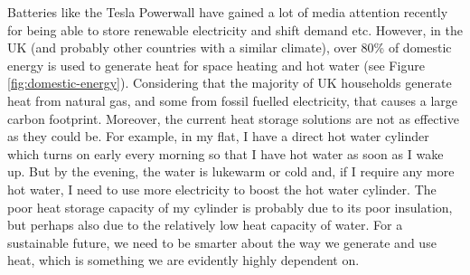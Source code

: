 Batteries like the Tesla Powerwall have gained a lot of media attention recently for being able to store renewable electricity and shift demand etc.
However, in the UK (and probably other countries with a similar climate), over 80\% of domestic energy is used to generate heat for space heating and hot water (see Figure \ref{fig:domestic-energy}).
Considering that the majority of UK households generate heat from natural gas, and some from fossil fuelled electricity, that causes a large carbon footprint.
Moreover, the current heat storage solutions are not as effective as they could be.
For example, in my flat, I have a direct hot water cylinder which turns on early every morning so that I have hot water as soon as I wake up.
But by the evening, the water is lukewarm or cold and, if I require any more hot water, I need to use more electricity to boost the hot water cylinder.
The poor heat storage capacity of my cylinder is probably due to its poor insulation, but perhaps also due to the relatively low heat capacity of water.
For a sustainable future, we need to be smarter about the way we generate and use heat, which is something we are evidently highly dependent on.

